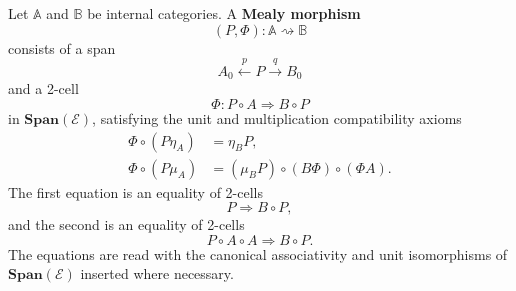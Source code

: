 \begin{definition}
\label{def:mealy-morphism}
    Let \(\mathbb A\) and \(\mathbb B\) be internal categories. A \textbf{Mealy morphism}
    \[
        (P,\Phi):\mathbb A\rightsquigarrow\mathbb B
    \]
    consists of a span
    \[
        A_0\xleftarrow{p}P\xrightarrow{q}B_0
    \]
    and a 2-cell
    \[
        \Phi:P\circ A\Rightarrow B\circ P
    \]
    in \(\mathbf{Span}(\mathcal E)\), satisfying the unit and multiplication compatibility axioms
    \begin{align}
        \Phi\circ(P\eta_A)&=\eta_B P,
        \label{eq:mealy-unit-abstract}
        \\
        \Phi\circ(P\mu_A)
        &=
        (\mu_B P)\circ(B\Phi)\circ(\Phi A).
        \label{eq:mealy-multiplication-abstract}
    \end{align}
    The first equation is an equality of 2-cells
    \[
        P\Rightarrow B\circ P,
    \]
    and the second is an equality of 2-cells
    \[
        P\circ A\circ A\Rightarrow B\circ P.
    \]
    The equations are read with the canonical associativity and unit isomorphisms of \(\mathbf{Span}(\mathcal E)\) inserted where necessary.
\end{definition}

